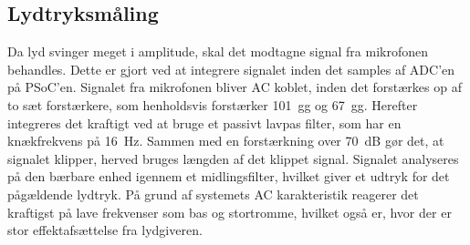 \subsection{Lydtryksmåling}
Da lyd svinger meget i amplitude, skal det modtagne signal fra mikrofonen behandles. Dette er gjort ved at integrere signalet inden det samples af ADC'en på PSoC'en. Signalet fra mikrofonen bliver AC koblet, inden det forstærkes op af to sæt forstærkere, som henholdsvis forstærker \SI{101}{gg} og \SI{67}{gg}. Herefter integreres det kraftigt ved at bruge et passivt lavpas filter, som har en knækfrekvens på \SI{16}{Hz}. Sammen med en forstærkning over \SI{70}{dB} gør det, at signalet klipper, herved bruges længden af det klippet signal. Signalet analyseres på den bærbare enhed igennem et midlingsfilter, hvilket giver et udtryk for det pågældende lydtryk. På grund af systemets AC karakteristik reagerer det kraftigst på lave frekvenser som bas og stortromme, hvilket også er, hvor der er stor effektafsættelse fra lydgiveren.